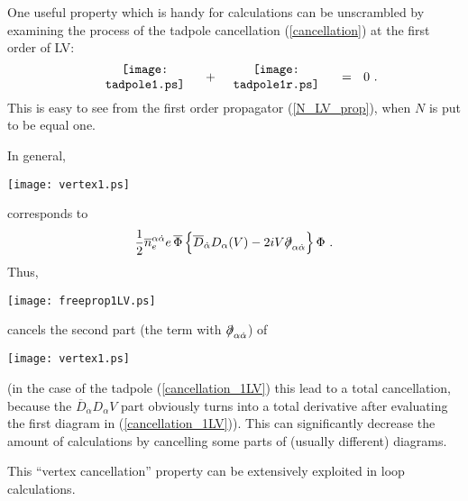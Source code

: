 \documentclass[paper,12pt]{revtex4}
\newcommand{\slashed}[1]{\hbox{{$#1$}\llap{$/$}}}
\begin{document}
	One useful property which is handy for calculations
	can be unscrambled by examining the process of the
	tadpole cancellation (\ref{cancellation}) at the first 
	order of LV:
\begin{equation}
\label{cancellation_1LV}
	\begin{minipage}[c]{3.0cm}
	\centering
	\texttt{[image: tadpole1.ps]} 
	\end{minipage}
	~+~
	\begin{minipage}[c]{3.0cm}
	\centering
	\texttt{[image: tadpole1r.ps]} 
	\end{minipage}
	~~=~~
	0
	~.
\end{equation}
	This is easy to see from the first order propagator
	(\ref{N_LV_prop}), when $ N $ is put to be equal one.

	In general, 
\begin{minipage}[b]{1.5cm}
\centering
\texttt{[image: vertex1.ps]} 
\vspace{-0.1cm}
\end{minipage}
	corresponds to
\[
	\frac{1}{2} \overline{n}_e^{\alpha\dot\alpha}
	e\, \overline{\Phi}\,
	\Bigl\{
		\overline{D}_{\dot\alpha} D_\alpha ( V )
		- 
		2 i V \slashed{\partial}_{\alpha\dot\alpha}
	\Bigr\}\,
	 \Phi
	~.
\] 
	Thus, 
\begin{minipage}[b]{1.7cm}
\centering
\texttt{[image: freeprop1LV.ps]} 
\vspace{-0.06cm}
\end{minipage}
	cancels the second part
	(the term with $ \slashed{\partial}_{\alpha\dot\alpha}$)
	of 
\begin{minipage}[b]{1.5cm}
\centering
\texttt{[image: vertex1.ps]} 
\vspace{-0.1cm}
\end{minipage}
	(in the case of the tadpole (\ref{cancellation_1LV}) 
	this lead to a total 
	cancellation,
	because the 
	$ \overline{D}_{\dot\alpha} D_\alpha V $
	part obviously turns into a total derivative after evaluating
	the first diagram in (\ref{cancellation_1LV})).
	This can significantly decrease the amount of calculations
	by cancelling some parts of (usually different) diagrams.

	This ``vertex cancellation'' property can be extensively
	exploited in loop calculations.
	
	
	
\end{document}

